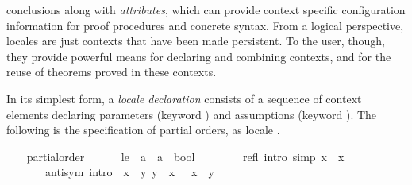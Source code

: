\begin{isabellebody}
\begin{isamarkuptext}
  conclusions along with \emph{attributes}, which can provide context
  specific configuration information for proof procedures and concrete
  syntax.  From a logical perspective, locales are just contexts that
  have been made persistent.  To the user, though, they provide
  powerful means for declaring and combining contexts, and for the
  reuse of theorems proved in these contexts.%
\end{isamarkuptext}%
\isamarkuptrue%
%
\isamarkuptrue%
%
\begin{isamarkuptext}%
In its simplest form, a
  \emph{locale declaration} consists of a sequence of context elements
  declaring parameters (keyword ) and assumptions
  (keyword ).  The following is the specification of
  partial orders, as locale .%
\end{isamarkuptext}%
\isamarkuptrue%
\ \ \isamarkupfalse%
\ partial{}order\ {}\isanewline
\ \ \ \ \ le\ {}{}\ {}{}a\ {}\ {}a\ {}\ bool{}\ {}\ {}{}{}\ {}{}{}\isanewline
\ \ \ \ \ refl\ {}intro{}\ simp{}{}\ {}x\ {}\ x{}\isanewline
\ \ \ \ \ \ \ anti{}sym\ {}intro{}{}\ {}{}\ x\ {}\ y{}\ y\ {}\ x\ {}\ {}\ x\ {}\ y{}\isanewline

\end{isabellebody}
